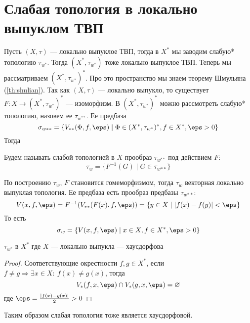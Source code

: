 \newpage
\section{Слабая топология в локально выпуклом ТВП}
Пусть $(X, \tau)$ --- локально выпуклое ТВП, тогда в $X^*$ мы заводим слабую* топологию $\tau_{w^*}$. Тогда $(X^*, \tau_{w^*})$ тоже локально выпуклое ТВП. Теперь мы рассматриваем $(X^*, \tau_{w^*})^*$. Про это пространство мы знаем теорему Шмульяна (\ref{th:shulian}). Так как $(X, \tau)$ --- локально выпукло, то существует $F: X \to (X^*, \tau_{w^*})^*$ --- изоморфизм. В $(X^*, \tau_{w^*})^*$ можно рассмотреть слабую* топологию, назовем ее $\tau_{w^{**}}$. Ее предбаза 
$$
\sigma_{w**} = \{V_{**}(\Phi, f , \eps) \mid \Phi \in (X^*, \tau_{w^*})^*, f \in X^*, \eps > 0\}
$$
Тогда 
\begin{definition}
	Будем называть слабой топологией в $X$ прообраз $\tau_{w^{**}}$ под действием $F$:
	$$
	\tau_w = \{F^{-1}(G)  \mid G \in \tau_{w{**}}\}
	$$
\end{definition}
По построению $\tau_w$, $F$ становится гомеморфизмом, тогда $\tau_w$ векторная локально выпуклая топология. Ее предбаза есть прообраз предбазы $\tau_{w{**}}$:
$$
V(x,f,\eps) = F^{-1}(V_{**}(F(x), f, \eps)) = \{y \in X \mid |f(x) - f(y)| < \eps \}
$$
То есть 
$$
\sigma_w = \{V(x, f, \eps) \mid x \in X, f \in X^*, \eps > 0\}
$$
\begin{claim}
	$\tau_{w^*}$ в $X^*$ где $X$ --- локально выпукла --- хаусдорфова
\end{claim}
\begin{proof}
	Соответствующие окрестности $f,g \in X^*$, если $f \neq g \Rightarrow \exists x \in X: \ f(x) \neq g(x)$, тогда
	$$
	V_*(f,x,\eps) \cap V_*(g,x,\eps) = \varnothing
	$$
	где $\eps = \frac{|f(x) - g(x)|}{2} > 0$
\end{proof}
Таким образом слабая топология тоже является хаусдорфовой. 

